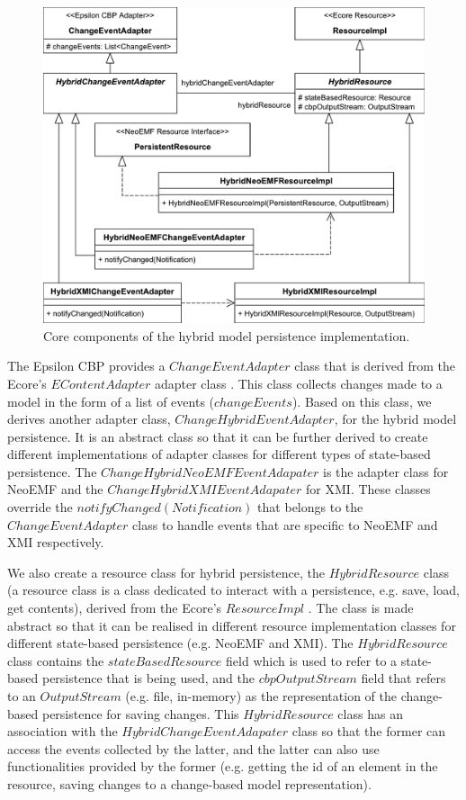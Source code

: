 \documentclass[10pt,conference]{IEEEtran}
\begin{document}
\begin{figure}[ht]
    \includegraphics[width=\linewidth]{images/class_diagram}
    \caption{Core components of the hybrid model persistence implementation.}
    \label{fig:class_diagram}
\end{figure}

The Epsilon CBP provides a $ChangeEventAdapter$ class \cite{DBLP:conf/models/YohannisKP17} that is derived from the Ecore's $EContentAdapter$ adapter class \cite{eclipse2018eContentAdapter}. This class collects changes made to a model in the form of a list of events ($changeEvents$). Based on this class, we derives another adapter class, $ChangeHybridEventAdapter$, for the hybrid model persistence. It is an abstract class so that it can be further derived to create different implementations of adapter classes for different types of state-based persistence. The $ChangeHybridNeoEMFEventAdapater$ is the adapter class for NeoEMF and the $ChangeHybridXMIEventAdapater$ for XMI. These classes override the $notifyChanged(Notification)$ that belongs to the $ChangeEventAdapter$ class to handle events that are specific to NeoEMF and XMI respectively. 

We also create a resource class for hybrid persistence, the $HybridResource$ class (a resource class is a class dedicated to interact with a persistence, e.g. save, load, get contents), derived from the Ecore's $ResourceImpl$ \cite{eclipse2018resourceImpl}. The class is made abstract so that it can be realised in different resource implementation classes for different state-based persistence (e.g. NeoEMF and XMI). The $HybridResource$ class contains the $stateBasedResource$ field which is used to refer to a state-based persistence that is being used, and the $cbpOutputStream$ field that refers to an $OutputStream$ (e.g. file, in-memory) as the representation of the change-based persistence for saving changes. This $HybridResource$ class has an association with the $HybridChangeEventAdapater$ class so that the former can access the events collected by the latter, and the latter can also use functionalities provided by the former (e.g. getting the id of an element in the resource, saving changes to a change-based model representation).
\end{document}
